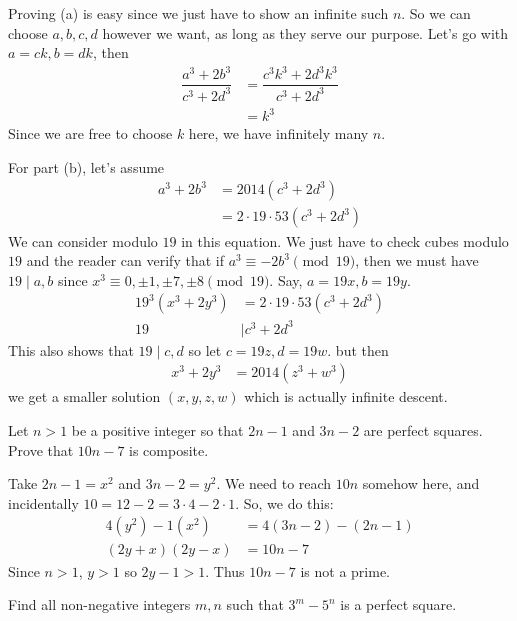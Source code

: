 \documentclass[problems.tex]{subfile}
\begin{document}
	\begin{solution}
		Proving (a) is easy since we just have to show an infinite such $n$. So we can choose $a,b,c,d$ however we want, as long as they serve our purpose. Let's go with $a=ck,b=dk$, then
			\begin{align*}
				\dfrac{a^3+2b^3}{c^3+2d^3}  & = \dfrac{c^3k^3+2d^3k^3}{c^3+2d^3}\\
											& = k^3
			\end{align*}
		Since we are free to choose $k$ here, we have infinitely many $n$.

		For part (b), let's assume
			\begin{align*}
				a^3+2b^3 & = 2014(c^3+2d^3)\\
						 & = 2\cdot19\cdot53(c^3+2d^3)
			\end{align*}
		We can consider modulo $19$ in this equation. We just have to check cubes modulo $19$ and the reader can verify that if $a^3\equiv-2b^3\pmod{19}$, then we must have $19\mid a,b$ since $x^3\equiv0,\pm1,\pm7,\pm8\pmod{19}$. Say, $a=19x,b=19y$.
			\begin{align*}
				19^3(x^3+2y^3) & = 2\cdot19\cdot53(c^3+2d^3)\\
				19 & \mid c^3+2d^3
			\end{align*}
		This also shows that $19\mid c,d$ so let $c=19z,d=19w$. but then
			\begin{align*}
				x^3+2y^3 & = 2014(z^3+w^3)
			\end{align*}
		we get a smaller solution $(x,y,z,w)$ which is actually infinite descent.
	\end{solution}

	\begin{problem}[Croatia $2015$]
		Let $n>1$ be a positive integer so that $2n-1$ and $3n-2$ are perfect squares. Prove that $10n-7$ is composite.
	\end{problem}

	\begin{solution}
		Take $2n-1=x^2$ and $3n-2=y^2$. We need to reach $10n$ somehow here, and incidentally $10=12-2=3\cdot4-2\cdot1$. So, we do this:
			\begin{align*}
				4(y^2)-1(x^2) & = 4(3n-2)-(2n-1)\\
				(2y+x)(2y-x)  & = 10n-7
			\end{align*}
		Since $n>1$, $y>1$ so $2y-1>1$. Thus $10n-7$ is not a prime.
	\end{solution}

	\begin{problem}
		Find all non-negative integers $m, n$ such that $3^m-5^n$ is a perfect square.
	\end{problem}
\end{document}
